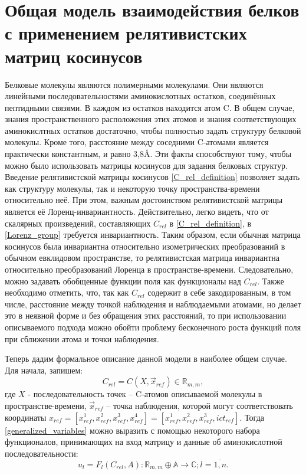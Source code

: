 \section{Общая модель взаимодействия белков с применением релятивистских матриц косинусов}
Белковые молекулы являются полимерными молекулами. Они являются линейными последовательностями аминокислотных остатков, соединённых пептидными связями. В каждом из остатков
находится атом C\textalpha. В общем случае, знания пространственного расположения этих атомов и знания соответствующих аминокислтных остатков достаточно, чтобы полностью задать структуру белковой молекулы.
Кроме того, расстояние между соседними C\textalpha-атомами является практически константным, и равно 3,8\AA. Эти факты способствуют тому, чтобы можно было использовать матрицы косинусов для задания белковых структур.
Введение релятивистской матрицы косинусов \ref{C_rel_definition} позволяет задать как структуру молекулы, так и некоторую точку пространства-времени относительно неё. При этом, важным достоинством релятивистской матрицы является её Лоренц-инвариантность. Действительно, легко видеть, что от скалярных произведений, составляющих $C_{rel}$ в \ref{C_rel_definition}, в \ref{Lorenz_group} требуется инвариантность. Таким образом, если обычная матрица косинусов была инвариантна относительно изометрических преобразований в обычном евклидовом пространстве, то релятивистская матрица инвариантна относительно преобразований Лоренца в пространстве-времени. Следовательно, можно задавать обобщенные функции поля как функционалы над $C_{rel}$. Также необходимо отметить, что, так как $C_{rel}$ содержит в себе закодированным, в том числе, расстояние между точкой наблюдения и наблюдаемыми атомами, но делает это в неявной форме и без обращения этих расстояний, то при использовании описываемого подхода можно обойти проблему бесконечного роста функций поля при сближении атома и точки наблюдения.

Теперь дадим формальное описание данной модели в наиболее общем случае. Для начала, запишем:
\begin{equation}
	C_{rel} = C(X, \vec{x}_{ref}) \in \mathbb{R}_{m,m},
\end{equation}
где $X$ - последовательность точек -- C\textalpha-атомов описываемой молекулы в пространстве-времени, $\vec{x}_{ref}$ -- точка наблюдения, которой могут соответствовать координаты
$x_{ref} = [x_{ref}^1, x_{ref}^2, x_{ref}^3, x_{ref}^4] = [x_{ref}^1, x_{ref}^2, x_{ref}^3, ict_{ref}]$.
Тогда \ref{generalized_variables} можно выразить с помощью некоторого набора функционалов, принимающих на вход матрицу и данные об аминокислотной последовательности:
\begin{equation}
	u_l = F_l(C_{rel}, A) : \mathbb{R}_{m,m} \oplus \mathbb{A} \rightarrow \mathbb{C}; l=\overline{1,n}.
	\label{generalized_variables1}
\end{equation}

